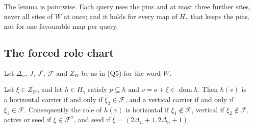 The lemma is pointwise. Each query uses the pins and at most three further sites, never all sites of $W$ at once; and it holds for every map of $H_\gamma$ that keeps the pins, not for one favourable map per query.

\subsection{The forced role chart}\label{ref:sec-roles}

Let $\Delta_n$, $J$, $J^\circ$, $\mathcal F$ and $Z_W$ be as in (Q5) for the word $W$.

\begin{lemma}[Corridors]\label{ref:roles}
Let $\xi\in Z_W$, and let $h\in H_\gamma$ satisfy $p\subseteq h$ and $v=o+\xi\in\operatorname{dom}h$. Then $h(v)$ is a horizontal carrier if and only if $\xi_2\in\mathcal F$, and a vertical carrier if and only if $\xi_1\in\mathcal F$. Consequently the role of $h(v)$ is horizontal if $\xi_1\notin\mathcal F$, vertical if $\xi_2\notin\mathcal F$, active or seed if $\xi\in\mathcal F^2$, and seed if $\xi=(2\Delta_n+1,2\Delta_n+1)$.
\end{lemma}

